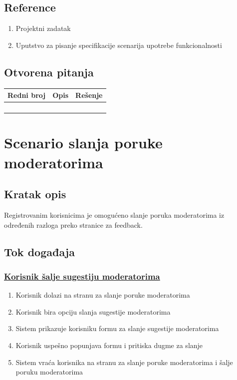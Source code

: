 \documentclass[11pt,a4paper]{article}
\begin{document}
\subsection{Reference}
\begin{enumerate}
    \item Projektni zadatak
    \item Uputstvo za pisanje specifikacije scenarija upotrebe funkcionalnosti
\end{enumerate}
\subsection{Otvorena pitanja}
\begin{center}
\begin{tabular}{| >{\centering\arraybackslash}m{1.9cm} | >{\centering\arraybackslash}m{4.9cm} | >{\centering\arraybackslash}m{4.9cm} |}
\hline
\rowcolor[HTML]{000000} 
{\color[HTML]{FFFFFF} Redni broj } & {\color[HTML]{FFFFFF} Opis } & {\color[HTML]{FFFFFF} Rešenje } \\ \hline
 &  & \\ \hline
 &  &  \\ \hline
 &  &  \\ \hline
 &  &  \\ \hline
\end{tabular}
\end{center}

\newpage

\section{Scenario slanja poruke moderatorima}
\subsection{Kratak opis}
Registrovanim korisnicima je omogućeno slanje poruka moderatorima iz određenih razloga preko stranice za feedback.

\subsection{Tok događaja}
\subsubsection{\underline{Korisnik šalje sugestiju moderatorima}}
\begin{enumerate}
    \item Korisnik dolazi na stranu za slanje poruke moderatorima
    \item Korisnik bira opciju slanja sugestije moderatorima
    \item Sistem prikazuje korisniku formu za slanje sugestije moderatorima
    \item Korisnik uspešno popunjava formu i pritiska dugme za slanje
    \item Sistem vraća korisnika na stranu za slanje poruke moderatorima i šalje poruku moderatorima
\end{enumerate}
\end{document}
